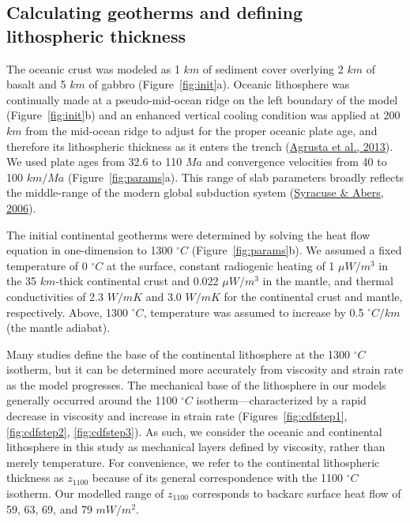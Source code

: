 \documentclass[draft,linenumbers]{agujournal2018}
\begin{document}
\hypertarget{calculating-geotherms-and-defining-lithospheric-thickness}{%
\subsection{Calculating geotherms and defining lithospheric
thickness}\label{calculating-geotherms-and-defining-lithospheric-thickness}}

The oceanic crust was modeled as 1 \(km\) of sediment cover overlying 2
\(km\) of basalt and 5 \(km\) of gabbro (Figure~\ref{fig:init}a).
Oceanic lithosphere was continually made at a pseudo-mid-ocean ridge on
the left boundary of the model (Figure~\ref{fig:init}b) and an enhanced
vertical cooling condition was applied at 200 \(km\) from the mid-ocean
ridge to adjust for the proper oceanic plate age, and therefore its
lithospheric thickness as it enters the trench
(\protect\hyperlink{ref-Agrusta2013}{Agrusta et al., 2013}). We used
plate ages from 32.6 to 110 \(Ma\) and convergence velocities from 40 to
100 \(km/Ma\) (Figure~\ref{fig:params}a). This range of slab parameters
broadly reflects the middle-range of the modern global subduction system
(\protect\hyperlink{ref-Syracuse2006}{Syracuse \& Abers, 2006}).

The initial continental geotherms were determined by solving the heat
flow equation in one-dimension to 1300 \(^{\circ}C\)
(Figure~\ref{fig:params}b). We assumed a fixed temperature of 0
\(^{\circ}C\) at the surface, constant radiogenic heating of 1
\(\mu W/m^{3}\) in the 35 \(km\)-thick continental crust and 0.022
\(\mu W/m^{3}\) in the mantle, and thermal conductivities of 2.3
\(W/mK\) and 3.0 \(W/mK\) for the continental crust and mantle,
respectively. Above, 1300 \(^{\circ}C\), temperature was assumed to
increase by 0.5 \(^{\circ}C/km\) (the mantle adiabat).

Many studies define the base of the continental lithosphere at the 1300
\(^{\circ}C\) isotherm, but it can be determined more accurately from
viscosity and strain rate as the model progresses. The mechanical base
of the lithosphere in our models generally occurred around the 1100
\(^{\circ}C\) isotherm---characterized by a rapid decrease in viscosity
and increase in strain rate
(Figures~\ref{fig:cdfstep1}, \ref{fig:cdfstep2}, \ref{fig:cdfstep3}). As
such, we consider the oceanic and continental lithosphere in this study
as mechanical layers defined by viscosity, rather than merely
temperature. For convenience, we refer to the continental lithospheric
thickness as \(z_{1100}\) because of its general correspondence with the
1100 \(^{\circ}C\) isotherm. Our modelled range of \(z_{1100}\)
corresponds to backarc surface heat flow of 59, 63, 69, and 79
\(mW/m^{2}\).
\end{document}
